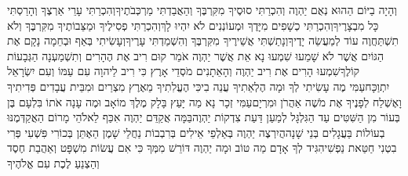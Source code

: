 \documentclass[../main/main.tex]{subfiles}
\begin{document}
\begin{multicols}{\ncols}
וְהָיָה בַיּוֹם הַהוּא נְאֻם יַהְוֶה וְהִכְרַתִּי סוּסֶיךָ מִקִּרְבֶּךָ וְהַאֲבַדְתִּי מַרְכְּבֹתֶיךָ\PreVerseSpace{}וְהִכְרַתִּי עָרֵי אַרְצֶךָ וְהָרַסְתִּי כָּל מִבְצָרֶיךָ\PreVerseSpace{}וְהִכְרַתִּי כְשָׁפִים מִיָּדֶךָ וּמְעוֹנְנִים לֹא יִהְיוּ לָךְ\PreVerseSpace{}וְהִכְרַתִּי פְסִילֶיךָ וּמַצֵּבוֹתֶיךָ מִקִּרְבֶּךָ וְלֹא תִשְׁתַּחֲוֶה עוֹד לְמַעֲשֵׂה יָדֶיךָ\PreVerseSpace{}וְנָתַשְׁתִּי אֲשֵׁירֶיךָ מִקִּרְבֶּךָ וְהִשְׁמַדְתִּי עָרֶיךָ\PreVerseSpace{}וְעָשִׂיתִי בְּאַף וּבְחֵמָה נָקָם אֶת הַגּוֹיִם אֲשֶׁר לֹא שָׁמֵעוּ \ClosedSection{}שִׁמְעוּ נָא אֵת אֲשֶׁר יַהְוֶה אֹמֵר קוּם רִיב אֶת הֶהָרִים וְתִשְׁמַעְנָה הַגְּבָעוֹת קוֹלֶךָ\PreVerseSpace{}שִׁמְעוּ הָרִים אֶת רִיב יַהְוֶה וְהָאֵתָנִים מֹסְדֵי אָרֶץ כִּי רִיב לַיהוָה עִם עַמּוֹ וְעִם יִשְׂרָאֵל יִתְוַכָּח\PreVerseSpace{}עַמִּי מֶה עָשִׂיתִי לְךָ וּמָה הֶלְאֵתִיךָ עֲנֵה בִי\PreVerseSpace{}כִּי הֶעֱלִתִיךָ מֵאֶרֶץ מִצְרַיִם וּמִבֵּית עֲבָדִים פְּדִיתִיךָ וָאֶשְׁלַח לְפָנֶיךָ אֶת מֹשֶׁה אַהֲרֹן וּמִרְיָם\PreVerseSpace{}עַמִּי זְכָר נָא מַה יָּעַץ בָּלָק מֶלֶךְ מוֹאָב וּמֶה עָנָה אֹתוֹ בִּלְעָם בֶּן בְּעוֹר מִן הַשִּׁטִּים עַד הַגִּלְגָּל לְמַעַן דַּעַת צִדְקוֹת יַהְוֶה\PreVerseSpace{}בַּמָּה אֲקַדֵּם יַהְוֶה אִכַּף לֵאלֹהֵי מָרוֹם הַאֲקַדְּמֶנּוּ בְעוֹלוֹת בַּעֲגָלִים בְּנֵי שָׁנָה\PreVerseSpace{}הֲיִרְצֶה יַהְוֶה בְּאַלְפֵי אֵילִים בְּרִבְבוֹת נַחֲלֵי שָׁמֶן הַאֶתֵּן בְּכוֹרִי פִּשְׁעִי פְּרִי בִטְנִי חַטַּאת נַפְשִׁי\PreVerseSpace{}הִגִּיד לְךָ אָדָם מַה טּוֹב וּמָה יַהְוֶה דּוֹרֵשׁ מִמְּךָ כִּי אִם עֲשׂוֹת מִשְׁפָּט וְאַהֲבַת חֶסֶד וְהַצְנֵעַ לֶכֶת עִם אֱלֹהֶיךָ\OpenSection{}\par

\end{multicols}
\end{document}
